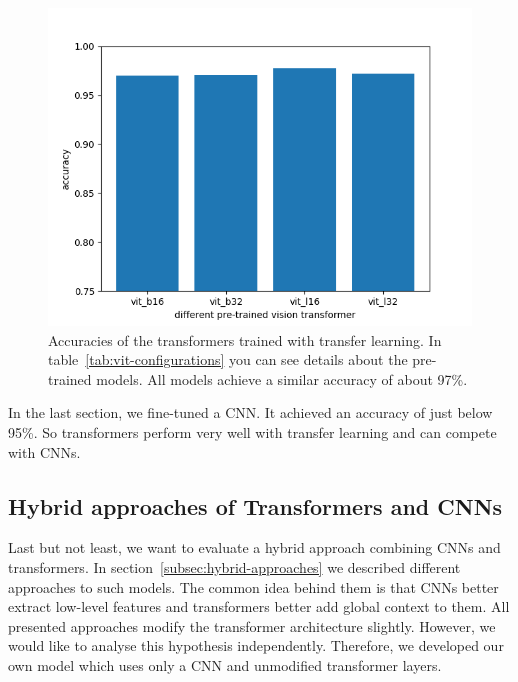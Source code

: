 \documentclass[a4paper]{scrartcl}
\begin{document}
    \begin{figure}[btp]
        \centering
        \includegraphics[width=0.8\linewidth]{img/plots/transfer_learning_transformer}
        \caption[Results of the transfer learning experiments]{Accuracies of the transformers trained with transfer learning.
        In table~\ref{tab:vit-configurations} you can see details about the pre-trained models.
        All models achieve a similar accuracy of about 97\%.
        }
        \label{fig:transfer-learning-experiment}
    \end{figure}

    In the last section, we fine-tuned a CNN\@.
    It achieved an accuracy of just below 95\%.
    So transformers perform very well with transfer learning and can compete with CNNs.

    \subsection{Hybrid approaches of Transformers and CNNs}\label{subsec:hybrid-approaches-of-transformers-and-cnns}
    Last but not least, we want to evaluate a hybrid approach combining CNNs and transformers.
    In section~\ref{subsec:hybrid-approaches} we described different approaches to such models.
    The common idea behind them is that CNNs better extract low-level features and transformers better add global context to them.
    All presented approaches modify the transformer architecture slightly.
    However, we would like to analyse this hypothesis independently.
    Therefore, we developed our own model which uses only a CNN and unmodified transformer layers.
\end{document}
